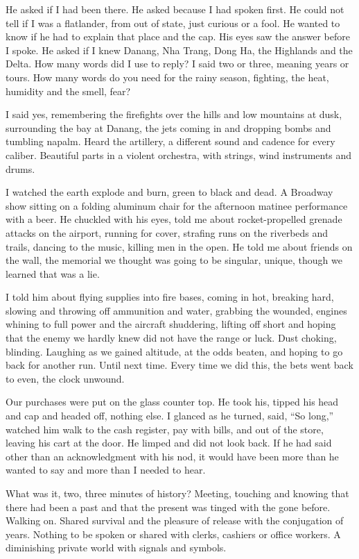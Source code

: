 He asked if I had been there. He asked because I had spoken first. He
could not tell if I was a flatlander, from out of state, just curious or
a fool. He wanted to know if he had to explain that place and the cap.
His eyes saw the answer before I spoke. He asked if I knew Danang, Nha
Trang, Dong Ha, the Highlands and the Delta. How many words did I use to
reply? I said two or three, meaning years or tours. How many words do
you need for the rainy season, fighting, the heat, humidity and the
smell, fear?

I said yes, remembering the firefights over the hills and low mountains
at dusk, surrounding the bay at Danang, the jets coming in and dropping
bombs and tumbling napalm. Heard the artillery, a different sound and
cadence for every caliber. Beautiful parts in a violent orchestra, with
strings, wind instruments and drums.

I watched the earth explode and burn, green to black and dead. A
Broadway show sitting on a folding aluminum chair for the afternoon
matinee performance with a beer. He chuckled with his eyes, told me
about rocket-propelled grenade attacks on the airport, running for
cover, strafing runs on the riverbeds and trails, dancing to the music,
killing men in the open. He told me about friends on the wall, the
memorial we thought was going to be singular, unique, though we learned
that was a lie.

I told him about flying supplies into fire bases, coming in hot,
breaking hard, slowing and throwing off ammunition and water, grabbing
the wounded, engines whining to full power and the aircraft shuddering,
lifting off short and hoping that the enemy we hardly knew did not have
the range or luck. Dust choking, blinding. Laughing as we gained
altitude, at the odds beaten, and hoping to go back for another run.
Until next time. Every time we did this, the bets went back to even, the
clock unwound.

Our purchases were put on the glass counter top. He took his, tipped his
head and cap and headed off, nothing else. I glanced as he turned, said,
``So long,'' watched him walk to the cash register, pay with bills, and
out of the store, leaving his cart at the door. He limped and did not
look back. If he had said other than an acknowledgment with his nod, it
would have been more than he wanted to say and more than I needed to
hear.

What was it, two, three minutes of history? Meeting, touching and
knowing that there had been a past and that the present was tinged with
the gone before. Walking on. Shared survival and the pleasure of release
with the conjugation of years. Nothing to be spoken or shared with
clerks, cashiers or office workers. A diminishing private world with
signals and symbols.

